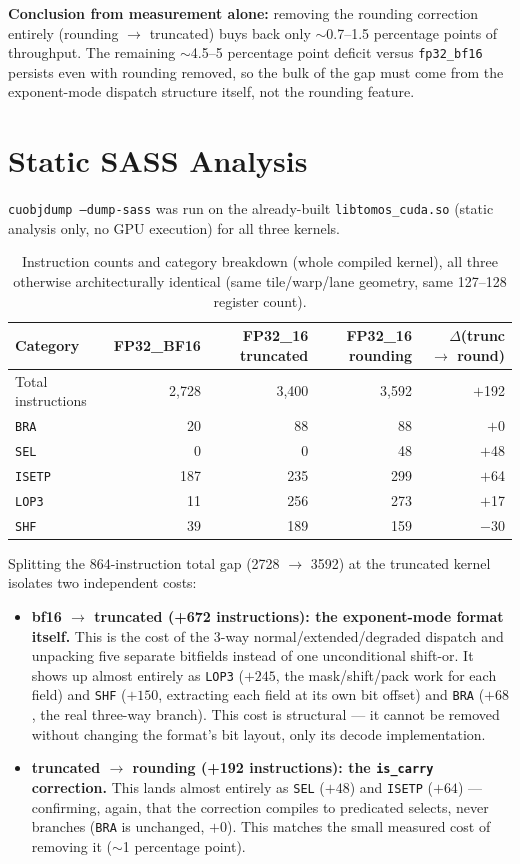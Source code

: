 \documentclass[11pt]{article}
\begin{document}
\textbf{Conclusion from measurement alone:} removing the rounding correction entirely (rounding $\to$ truncated) buys back only $\sim$0.7--1.5 percentage points of throughput. The remaining $\sim$4.5--5 percentage point deficit versus \texttt{fp32\_bf16} persists even with rounding removed, so the bulk of the gap must come from the exponent-mode dispatch structure itself, not the rounding feature.

\section{Static SASS Analysis}

\texttt{cuobjdump --dump-sass} was run on the already-built \texttt{libtomos\_cuda.so} (static analysis only, no GPU execution) for all three kernels.

\begin{table}[h]
\centering
\begin{tabular}{lrrrr}
\toprule
Category & FP32\_BF16 & FP32\_16 truncated & FP32\_16 rounding & $\Delta$(trunc $\to$ round) \\
\midrule
Total instructions & 2{,}728 & 3{,}400 & 3{,}592 & $+$192 \\
\texttt{BRA}   & 20  & 88  & 88  & $+$0 \\
\texttt{SEL}   & 0   & 0   & 48  & $+$48 \\
\texttt{ISETP} & 187 & 235 & 299 & $+$64 \\
\texttt{LOP3}  & 11  & 256 & 273 & $+$17 \\
\texttt{SHF}   & 39  & 189 & 159 & $-$30 \\
\bottomrule
\end{tabular}
\caption{Instruction counts and category breakdown (whole compiled kernel), all three otherwise architecturally identical (same tile/warp/lane geometry, same 127--128 register count).}
\end{table}

Splitting the 864-instruction total gap (2728 $\to$ 3592) at the truncated kernel isolates two independent costs:

\begin{itemize}
\item \textbf{bf16 $\to$ truncated (+672 instructions): the exponent-mode format itself.} This is the cost of the 3-way normal/extended/degraded dispatch and unpacking five separate bitfields instead of one unconditional shift-or. It shows up almost entirely as \texttt{LOP3} ($+245$, the mask/shift/pack work for each field) and \texttt{SHF} ($+150$, extracting each field at its own bit offset) and \texttt{BRA} ($+68$, the real three-way branch). This cost is structural --- it cannot be removed without changing the format's bit layout, only its decode implementation.
\item \textbf{truncated $\to$ rounding (+192 instructions): the \texttt{is\_carry} correction.} This lands almost entirely as \texttt{SEL} ($+48$) and \texttt{ISETP} ($+64$) --- confirming, again, that the correction compiles to predicated selects, never branches (\texttt{BRA} is unchanged, $+0$). This matches the small measured cost of removing it ($\sim$1 percentage point).
\end{itemize}
\end{document}
